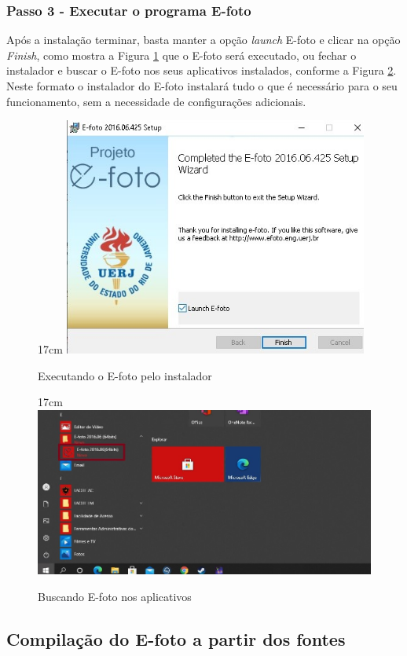 \subsubsection{Passo 3 - Executar o programa E-foto}
Após a instalação terminar, basta manter a opção \textit{launch} E-foto e clicar na opção \textit{Finish}, como mostra a Figura \ref{fig:launch1} que o E-foto será executado, ou fechar o instalador e buscar o E-foto nos seus aplicativos instalados, conforme a Figura \ref{fig:launch2}. Neste formato o instalador do E-foto instalará tudo o que é necessário para o seu funcionamento, sem a necessidade de configurações adicionais.

\begin{figure}[!ht]{17cm}
	\centering
	\includegraphics[width=10cm]{Figuras/launch1.jpg}
	\caption{Executando o E-foto pelo instalador} \label{fig:launch1}
\end{figure}

\begin{figure}[!ht]{17cm}
	\centering
	\includegraphics[width=12cm]{Figuras/launch2.jpg}
	\caption{Buscando E-foto nos aplicativos} \label{fig:launch2}
\end{figure}

\subsection{Compilação do E-foto a partir dos fontes}
